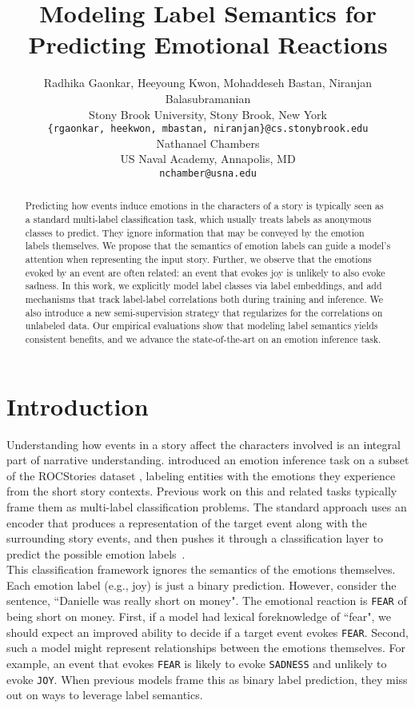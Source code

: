 \documentclass[11pt,a4paper]{article}
\title{Modeling Label Semantics for Predicting Emotional Reactions}
\author{
  Radhika Gaonkar, Heeyoung Kwon, Mohaddeseh Bastan, Niranjan Balasubramanian \\
  Stony Brook University, Stony Brook, New York \\
  \texttt{\{rgaonkar, heekwon, mbastan, niranjan\}@cs.stonybrook.edu} \\\AND
  Nathanael Chambers \\
  US Naval Academy, Annapolis, MD \\
  \texttt{nchamber@usna.edu}}
\date{}
\begin{document}
\maketitle
\begin{abstract}

Predicting how events induce emotions in the characters of a story is typically seen as a standard multi-label classification task, which usually treats labels as anonymous classes to predict. They ignore information that may be conveyed by the emotion labels themselves. 
We propose that the semantics of emotion labels can guide a model's attention when representing the input story. Further, we observe that the emotions evoked by an event are often related: an event that evokes joy is unlikely to also evoke sadness.
In this work, we explicitly model label classes via label embeddings, and add mechanisms that track label-label correlations both during training and inference. We also introduce a new semi-supervision strategy that regularizes for the correlations on unlabeled data. Our empirical evaluations show that modeling label semantics yields consistent benefits, and we advance the state-of-the-art on an emotion inference task.

\end{abstract}

\section{Introduction}
Understanding how events in a story affect the characters involved is an integral part of narrative understanding. \citet{rashkin2018modeling} introduced an emotion inference task on a subset of the ROCStories dataset \cite{mostafazadeh2016corpus}, labeling entities with the emotions they experience from the short story contexts. Previous work on this and related tasks typically frame them as multi-label classification problems. The standard approach uses an encoder that produces a representation of the target event along with the surrounding story events, and then pushes it through a classification layer to predict the possible emotion labels~\cite{rashkin2018modeling,wang2018joint}.\\
This classification framework ignores the semantics of the emotions themselves. Each emotion label (e.g., joy) is just a binary prediction. However, consider the sentence, ``Danielle was really short on money". The emotional reaction is \texttt{FEAR} of being short on money. First, if a model had lexical foreknowledge of ``fear", we should expect an improved ability to decide if a target event evokes \texttt{FEAR}. Second, such a model might represent relationships between the emotions themselves. For example, an event that evokes \texttt{FEAR} is likely to evoke \texttt{SADNESS} and unlikely to evoke \texttt{JOY}. When previous models frame this as binary label prediction, they miss out on ways to leverage label semantics.
\end{document}
